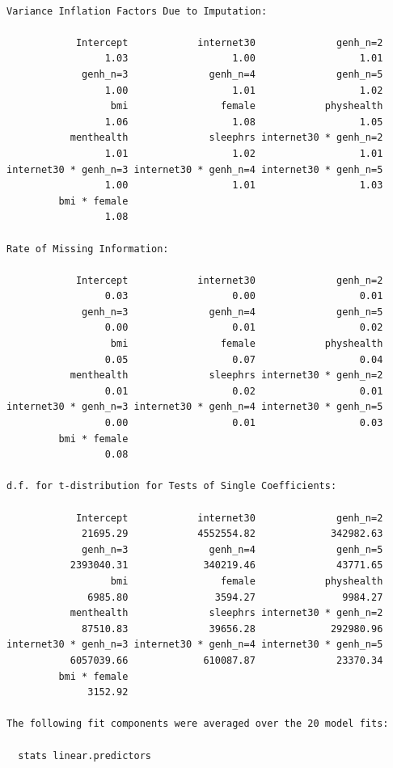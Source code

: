 \documentclass[]{book}
\theoremstyle{definition}
\theoremstyle{definition}
\theoremstyle{definition}
\theoremstyle{remark}
\begin{document}
\begin{verbatim}

Variance Inflation Factors Due to Imputation:

            Intercept            internet30              genh_n=2 
                 1.03                  1.00                  1.01 
             genh_n=3              genh_n=4              genh_n=5 
                 1.00                  1.01                  1.02 
                  bmi                female            physhealth 
                 1.06                  1.08                  1.05 
           menthealth              sleephrs internet30 * genh_n=2 
                 1.01                  1.02                  1.01 
internet30 * genh_n=3 internet30 * genh_n=4 internet30 * genh_n=5 
                 1.00                  1.01                  1.03 
         bmi * female 
                 1.08 

Rate of Missing Information:

            Intercept            internet30              genh_n=2 
                 0.03                  0.00                  0.01 
             genh_n=3              genh_n=4              genh_n=5 
                 0.00                  0.01                  0.02 
                  bmi                female            physhealth 
                 0.05                  0.07                  0.04 
           menthealth              sleephrs internet30 * genh_n=2 
                 0.01                  0.02                  0.01 
internet30 * genh_n=3 internet30 * genh_n=4 internet30 * genh_n=5 
                 0.00                  0.01                  0.03 
         bmi * female 
                 0.08 

d.f. for t-distribution for Tests of Single Coefficients:

            Intercept            internet30              genh_n=2 
             21695.29            4552554.82             342982.63 
             genh_n=3              genh_n=4              genh_n=5 
           2393040.31             340219.46              43771.65 
                  bmi                female            physhealth 
              6985.80               3594.27               9984.27 
           menthealth              sleephrs internet30 * genh_n=2 
             87510.83              39656.28             292980.96 
internet30 * genh_n=3 internet30 * genh_n=4 internet30 * genh_n=5 
           6057039.66             610087.87              23370.34 
         bmi * female 
              3152.92 

The following fit components were averaged over the 20 model fits:

  stats linear.predictors 
\end{verbatim}
\end{document}
